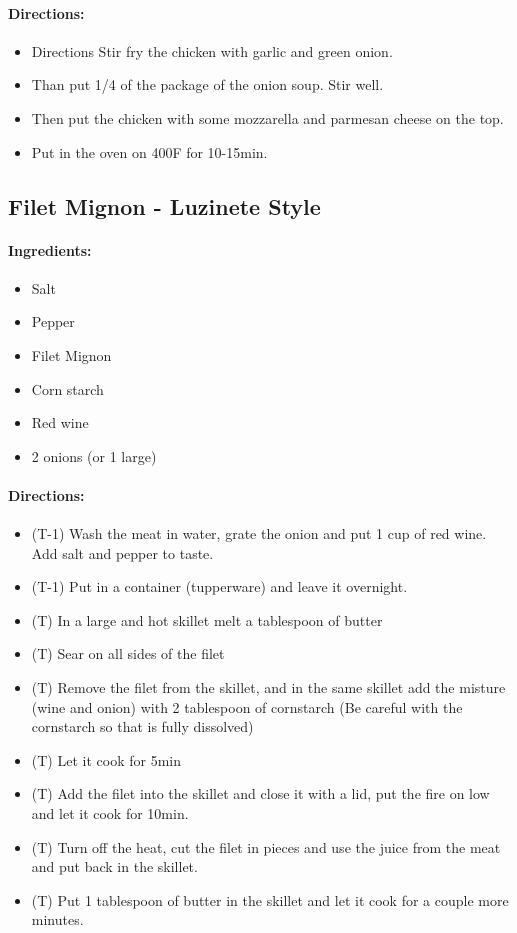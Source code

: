 \documentclass{article}
\begin{document}
\paragraph{Directions:}
\begin{itemize}
    \item Directions Stir fry the chicken with garlic and green onion.
    \item Than put 1/4 of the package of the onion soup. Stir well.
    \item Then put the chicken with some mozzarella and parmesan cheese on the top.
    \item Put in the oven on 400F for 10-15min.
\end{itemize}

\subsection{Filet Mignon - Luzinete Style}

\paragraph{Ingredients:}
\begin{itemize}
    \item Salt
    \item Pepper
    \item Filet Mignon
    \item Corn starch
    \item Red wine
    \item 2 onions (or 1 large)
\end{itemize}

\paragraph{Directions:}
\begin{itemize}
    \item (T-1) Wash the meat in water, grate the onion and put 1 cup of red wine. Add salt and pepper to taste.
    \item (T-1) Put in a container (tupperware) and leave it overnight.
    \item (T) In a large and hot skillet melt a tablespoon of butter
    \item (T) Sear on all sides of the filet
    \item (T) Remove the filet from the skillet, and in the same skillet add the misture (wine and onion) with 2 tablespoon of cornstarch (Be careful with the cornstarch so that is fully dissolved)
    \item (T) Let it cook for 5min
    \item (T) Add the filet into the skillet and close it with a lid, put the fire on low and let it cook for 10min.
    \item (T) Turn off the heat, cut the filet in pieces and use the juice from the meat and put back in the skillet.
    \item (T) Put 1 tablespoon of butter in the skillet and let it cook for a couple more minutes.
\end{itemize}
\end{document}
